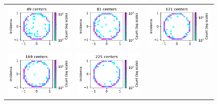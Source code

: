 \documentclass[12pt]{report} %
\begin{document}
\begin{figure}[h]
  \hspace*{-2cm}
  \begin{tabular}{ccc}
    {\includegraphics[width=.4\textwidth]{imagenes/experiments/2d/pde_parabola/distribution_of_errors_L_inf_end_C49.pdf}} &
    \includegraphics[width=.4\textwidth]{imagenes/experiments/2d/pde_parabola/distribution_of_errors_L_inf_end_C81.pdf} &
    \includegraphics[width=.4\textwidth]{imagenes/experiments/2d/pde_parabola/distribution_of_errors_L_inf_end_C121.pdf} \\
    \includegraphics[width=.4\textwidth]{imagenes/experiments/2d/pde_parabola/distribution_of_errors_L_inf_end_C169.pdf} &
    \includegraphics[width=.4\textwidth]{imagenes/experiments/2d/pde_parabola/distribution_of_errors_L_inf_end_C225.pdf} &

\end{tabular}
\end{figure}
\end{document}
